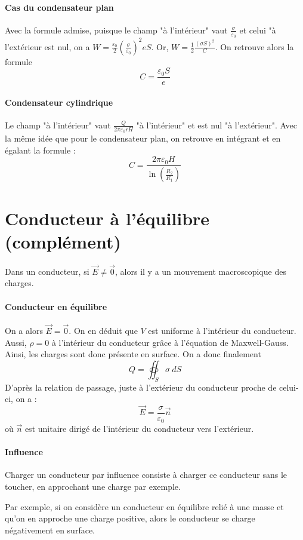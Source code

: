 \documentclass[french]{book}
\theoremstyle{plain}
\theoremstyle{definition}
\theoremstyle{remark}
\begin{document}
\paragraph{Cas du condensateur plan}
Avec la formule admise, puisque le champ "à l'intérieur" vaut $\displaystyle\frac{\sigma}{\varepsilon_0}$ et celui "à l'extérieur est nul, on a $\displaystyle W=\frac{\varepsilon_0}{2}\left(\frac{\sigma}{\varepsilon_0}\right)^2eS$. Or, $\displaystyle W=\frac{1}{2}\frac{(\sigma S)^2}{C}$. On retrouve alors la formule $$C=\frac{\varepsilon_0 S}{e}$$
\paragraph{Condensateur cylindrique}
Le champ "à l'intérieur" vaut $\displaystyle\frac{Q}{2\pi\varepsilon_0 rH}$ "à l'intérieur" et est nul "à l'extérieur". Avec la même idée que pour le condensateur plan, on retrouve en intégrant et en égalant la formule : $$C=\frac{2\pi\varepsilon_0 H}{\ln\left(\frac{R_2}{R_1}\right)}$$
\section{Conducteur à l'équilibre (complément)}
Dans un conducteur, si $\overrightarrow{E}\ne\overrightarrow{0}$, alors il y a un mouvement macroscopique des charges.
\paragraph{Conducteur en équilibre} On a alors $\overrightarrow{E}=\overrightarrow{0}$. On en déduit que $V$ est uniforme à l'intérieur du conducteur. Aussi, $\rho=0$ à l'intérieur du conducteur grâce à l'équation de Maxwell-Gauss. Ainsi, les charges sont donc présente en surface. On a donc finalement $$Q=\oiint_S\sigma \ dS$$ D'après la relation de passage, juste à l'extérieur du conducteur proche de celui-ci, on a : $$\overrightarrow{E}=\frac{\sigma}{\varepsilon_0}\overrightarrow{n}$$ où $\overrightarrow{n}$ est unitaire dirigé de l'intérieur du conducteur vers l'extérieur.
\paragraph{Influence} Charger un conducteur par influence consiste à charger ce conducteur sans le toucher, en approchant une charge par exemple. \\ \par Par exemple, si on considère un conducteur en équilibre relié à une masse et qu'on en approche une charge positive, alors le conducteur se charge négativement en surface.
\end{document}
